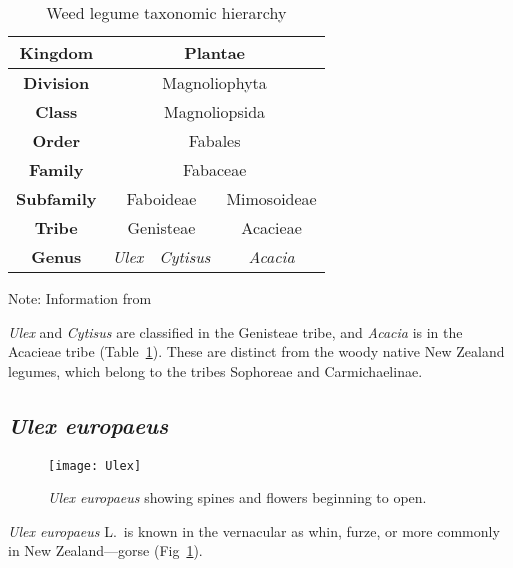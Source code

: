 \begin{table}
\caption{Weed legume taxonomic hierarchy}
  \centering
  \begin{tabular}{|c|c|c|c|}
    \hline \textbf{Kingdom}    & \multicolumn{3}{c|}{Plantae} \\
    \hline \textbf{Division}   & \multicolumn{3}{c|}{Magnoliophyta} \\
    \hline \textbf{Class}      & \multicolumn{3}{c|}{Magnoliopsida} \\
    \hline \textbf{Order}      & \multicolumn{3}{c|}{Fabales} \\
    \hline \textbf{Family}     & \multicolumn{3}{c|}{Fabaceae} \\
    \hline \textbf{Subfamily}  & \multicolumn{2}{c|}{Faboideae}    & Mimosoideae\\
    \hline \textbf{Tribe}      & \multicolumn{2}{c|}{Genisteae}     & Acacieae\\
    \hline \textbf{Genus}      & \emph{Ulex} & \emph{Cytisus}      & \emph{Acacia} \\
    \hline
  \end{tabular}

   \label{taxbox-Weed}
  \medskip
  \raggedright
  {\footnotesize
\hskip 3cm Note: Information from \citet{ILDIS}}
\end{table}


\emph{Ulex} and \emph{Cytisus} are classified in the Genisteae
tribe, and \emph{Acacia} is in the Acacieae tribe
(Table~\ref{taxbox-Weed}). These are distinct from the woody native
New Zealand legumes, which belong to the tribes Sophoreae and
Carmichaelinae.






\subsection{\emph{Ulex europaeus}}

\begin{figure} [tb]
    \centering
    \texttt{[image: Ulex]}
    \caption[\emph{Ulex europaeus}]{\emph{Ulex europaeus} showing
     spines and flowers beginning to open.}
    \label{p-Ulex}
\end{figure}



\emph{Ulex europaeus} L.~is known in the vernacular as whin, furze,
or more commonly in New Zealand---gorse (Fig~\ref{p-Ulex}).

